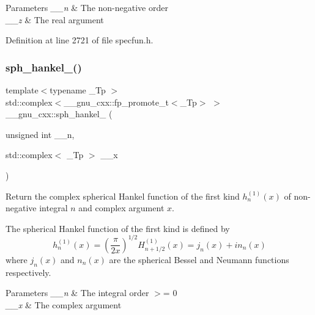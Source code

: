 \begin{DoxyParams}{Parameters}
{\em \+\_\+\+\_\+n} & The non-\/negative order \\
\hline
{\em \+\_\+\+\_\+z} & The real argument \\
\hline
\end{DoxyParams}


Definition at line 2721 of file specfun.\+h.

\mbox{\label{group__gnu__math__spec__func_ga3d256857c000a966e89526cb99253aca}} 
\subsubsection{\texorpdfstring{sph\+\_\+hankel\+\_()}{sph\_hankel\_1()}\hspace{0.1cm}{\footnotesize\ttfamily [2/2]}}
{\footnotesize\ttfamily template$<$typename \+\_\+\+Tp $>$ \\
std\+::complex$<$\+\_\+\+\_\+gnu\+\_\+cxx\+::fp\+\_\+promote\+\_\+t$<$\+\_\+\+Tp$>$ $>$ \+\_\+\+\_\+gnu\+\_\+cxx\+::sph\+\_\+hankel\+\_ (\begin{DoxyParamCaption}\item[{unsigned int}]{\+\_\+\+\_\+n,  }\item[{std\+::complex$<$ \+\_\+\+Tp $>$}]{\+\_\+\+\_\+x }\end{DoxyParamCaption})\hspace{0.3cm}{\ttfamily [inline]}}

Return the complex spherical Hankel function of the first kind $ h^{(1)}_n(x) $ of non-\/negative integral $ n $ and complex argument $ x $.

The spherical Hankel function of the first kind is defined by \[ h^{(1)}_n(x) = \left(\frac{\pi}{2x} \right) ^{1/2} H^{(1)}_{n+1/2}(x) = j_n(x) + i n_n(x) \] where $ j_n(x) $ and $ n_n(x) $ are the spherical Bessel and Neumann functions respectively.


\begin{DoxyParams}{Parameters}
{\em \+\_\+\+\_\+n} & The integral order $>$= 0 \\
\hline
{\em \+\_\+\+\_\+x} & The complex argument \\
\hline
\end{DoxyParams}


